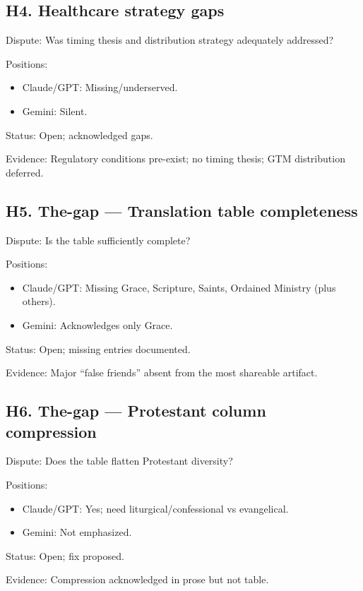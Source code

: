 \documentclass[11pt,letterpaper]{article}
\begin{document}
\subsection{H4. Healthcare strategy gaps}

\begin{reflist}
\item[Dispute:] Was timing thesis and distribution strategy adequately addressed?
\item[Positions:]~
  \begin{itemize}[nosep]
    \item Claude/GPT: Missing/underserved.
    \item Gemini: Silent.
  \end{itemize}
\item[Status:] Open; acknowledged gaps.
\item[Evidence:] Regulatory conditions pre-exist; no timing thesis; GTM distribution deferred.
\end{reflist}

\subsection{H5. The-gap --- Translation table completeness}

\begin{reflist}
\item[Dispute:] Is the table sufficiently complete?
\item[Positions:]~
  \begin{itemize}[nosep]
    \item Claude/GPT: Missing Grace, Scripture, Saints, Ordained Ministry (plus others).
    \item Gemini: Acknowledges only Grace.
  \end{itemize}
\item[Status:] Open; missing entries documented.
\item[Evidence:] Major ``false friends'' absent from the most shareable artifact.
\end{reflist}

\subsection{H6. The-gap --- Protestant column compression}

\begin{reflist}
\item[Dispute:] Does the table flatten Protestant diversity?
\item[Positions:]~
  \begin{itemize}[nosep]
    \item Claude/GPT: Yes; need liturgical/confessional vs evangelical.
    \item Gemini: Not emphasized.
  \end{itemize}
\item[Status:] Open; fix proposed.
\item[Evidence:] Compression acknowledged in prose but not table.
\end{reflist}
\end{document}
